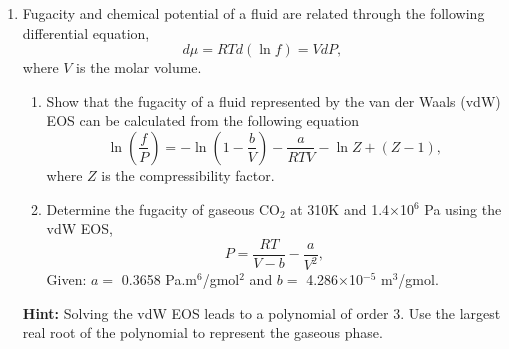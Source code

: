 \documentclass[12pts,a4paper,amsmath,amssymb,floatfix]{article}%
\newcommand{\frc}{\displaystyle\frac}
\begin{document}
\begin{enumerate}[label=\bfseries Example \arabic*]
\item\label{Example:3} Fugacity and chemical potential of a fluid are related through the following differential equation,
      \begin{displaymath}
           d\mu = RTd\left(\ln f\right) = VdP,
      \end{displaymath}
      where $V$ is the molar volume.
      \begin{enumerate}
        \item Show that the fugacity of a fluid represented by the van der Waals (vdW) EOS can be calculated from the following equation
           \begin{displaymath}
             \ln\left(\frc{f}{P}\right) = -\ln\left(1-\frc{b}{V}\right) - \frc{a}{RTV} - \ln Z + \left(Z - 1\right),
           \end{displaymath}
           where $Z$ is the compressibility factor.
        \item Determine the fugacity of gaseous CO$_{2}$ at 310K and 1.4$\times$10$^{6}$ Pa using the vdW  EOS,
               \begin{displaymath}
                  P = \frc{RT}{V-b} - \frc{a}{V^{2}},
               \end{displaymath}
               Given: $a=$ 0.3658 Pa.m$^{6}$/gmol$^{2}$ and $b=$ 4.286$\times$10$^{-5}$ m$^{3}$/gmol. 
     \end{enumerate}
{\bf Hint:} Solving the vdW EOS leads to a polynomial of order 3. Use the largest real root of the polynomial to represent the gaseous phase.

\bigskip 


\end{enumerate}
\end{document}
